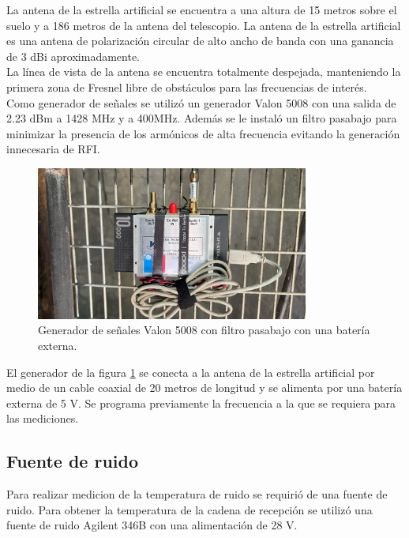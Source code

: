 La antena de la estrella artificial se encuentra a una altura de 15 metros sobre el suelo y a 186 metros de la antena del telescopio. La antena de la estrella artificial es una antena de polarización circular de alto ancho de banda con una ganancia de 3 dBi aproximadamente.\\

La línea de vista de la antena se encuentra totalmente despejada, manteniendo la primera zona de Fresnel libre de obstáculos para las frecuencias de interés.\\

Como generador de señales se utilizó un generador Valon 5008 con una salida de 2.23 dBm a 1428 MHz y a 400MHz. Además se le instaló un filtro pasabajo para minimizar la presencia de los armónicos de alta frecuencia evitando la generación innecesaria de RFI.\\

\begin{figure}
    \centering
    \includegraphics[width=0.8\textwidth]{img/valon}
    \caption{Generador de señales Valon 5008 con filtro pasabajo con una batería externa.}
    \label{fig:generador}
\end{figure}

El generador de la figura \ref{fig:generador} se conecta a la antena de la estrella artificial por medio de un cable coaxial de 20 metros de longitud y se alimenta por una batería externa de 5 V. Se programa previamente la frecuencia a la que se requiera para las mediciones.\\

\subsection{Fuente de ruido}

Para realizar medicion de la temperatura de ruido se requirió de una fuente de ruido. Para obtener la temperatura de la cadena de recepción se utilizó una fuente de ruido Agilent 346B con una alimentación de 28 V.\\

